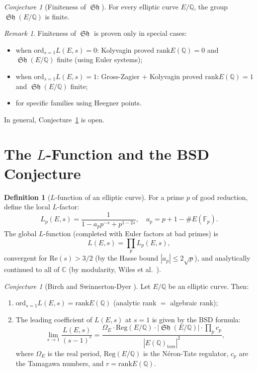 \documentclass[12pt,a4paper]{amsart}
\theoremstyle{definition}
\newtheorem{definition}[theorem]{Definition}
\theoremstyle{remark}
\newtheorem{remark}[theorem]{Remark}
\newtheorem{conjecture}[theorem]{Conjecture}
\newcommand{\Q}{\mathbb{Q}}
\newcommand{\C}{\mathbb{C}}
\newcommand{\F}{\mathbb{F}}
\DeclareMathOperator{\Sha}{\mathfrak{Sh}}
\newcommand{\rank}{\mathrm{rank}}
\newcommand{\ord}{\mathrm{ord}}
\begin{document}
\begin{conjecture}[Finiteness of $\Sha$]\label{conj:sha}
  For every elliptic curve $E/\Q$, the group $\Sha(E/\Q)$ is finite.
\end{conjecture}

\begin{remark}
  Finiteness of $\Sha$ is proven only in special cases:
  \begin{itemize}
    \item when $\ord_{s=1}L(E,s) = 0$: Kolyvagin \cite{Kolyvagin1988} proved $\rank E(\Q) = 0$ and $\Sha(E/\Q)$ finite (using Euler systems);
    \item when $\ord_{s=1}L(E,s) = 1$: Gross-Zagier \cite{GZ1986} + Kolyvagin proved $\rank E(\Q) = 1$ and $\Sha(E/\Q)$ finite;
    \item for specific families using Heegner points.
  \end{itemize}
  In general, Conjecture~\ref{conj:sha} is open.
\end{remark}

\section{The $L$-Function and the BSD Conjecture}\label{sec:bsd}

\begin{definition}[$L$-function of an elliptic curve]
  For a prime $p$ of good reduction, define the local $L$-factor:
  \[
    L_p(E,s) = \frac{1}{1 - a_p p^{-s} + p^{1-2s}}, \quad
    a_p = p + 1 - \#E(\F_p).
  \]
  The global $L$-function (completed with Euler factors at bad primes) is
  \[
    L(E,s) = \prod_p L_p(E,s),
  \]
  convergent for $\mathrm{Re}(s) > 3/2$ (by the Hasse bound $|a_p| \leq 2\sqrt{p}$),
  and analytically continued to all of $\C$ (by modularity, Wiles et al.\ \cite{BCDT2001}).
\end{definition}

\begin{conjecture}[Birch and Swinnerton-Dyer \cite{BSD1965}]\label{conj:bsd}
  Let $E/\Q$ be an elliptic curve. Then:
  \begin{enumerate}[label=(\roman*)]
    \item $\ord_{s=1} L(E,s) = \rank E(\Q)$ \quad (analytic rank $=$ algebraic rank);
    \item The leading coefficient of $L(E,s)$ at $s=1$ is given by the BSD formula:
    \[
      \lim_{s\to 1} \frac{L(E,s)}{(s-1)^r} =
      \frac{\Omega_E \cdot \mathrm{Reg}(E/\Q) \cdot |\Sha(E/\Q)| \cdot \prod_p c_p}
           {|E(\Q)_{\mathrm{tors}}|^2},
    \]
    where $\Omega_E$ is the real period, $\mathrm{Reg}(E/\Q)$ is the Néron-Tate
    regulator, $c_p$ are the Tamagawa numbers, and $r = \rank E(\Q)$.
  \end{enumerate}
\end{conjecture}
\end{document}
